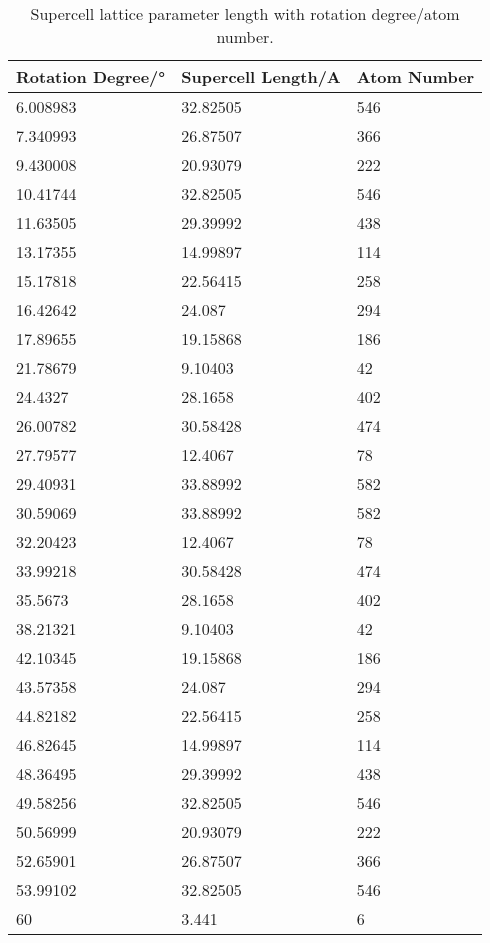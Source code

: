 \begin{table}[ht]
	\caption[Supercell lattice parameter length]{
		Supercell lattice parameter length with rotation degree/atom number.
	}
	\begin{tabular}{lll}
	\toprule
	Rotation Degree/° & Supercell Length/A & Atom Number \\
	\midrule
	6.008983          & 32.82505           & 546         \\
	7.340993          & 26.87507           & 366         \\
	9.430008          & 20.93079           & 222         \\
	10.41744          & 32.82505           & 546         \\
	11.63505          & 29.39992           & 438         \\
	13.17355          & 14.99897           & 114         \\
	15.17818          & 22.56415           & 258         \\
	16.42642          & 24.087             & 294         \\
	17.89655          & 19.15868           & 186         \\
	21.78679          & 9.10403            & 42          \\
	24.4327           & 28.1658            & 402         \\
	26.00782          & 30.58428           & 474         \\
	27.79577          & 12.4067            & 78          \\
	29.40931          & 33.88992           & 582         \\
	30.59069          & 33.88992           & 582         \\
	32.20423          & 12.4067            & 78          \\
	33.99218          & 30.58428           & 474         \\
	35.5673           & 28.1658            & 402         \\
	38.21321          & 9.10403            & 42          \\
	42.10345          & 19.15868           & 186         \\
	43.57358          & 24.087             & 294         \\
	44.82182          & 22.56415           & 258         \\
	46.82645          & 14.99897           & 114         \\
	48.36495          & 29.39992           & 438         \\
	49.58256          & 32.82505           & 546         \\
	50.56999          & 20.93079           & 222         \\
	52.65901          & 26.87507           & 366         \\
	53.99102          & 32.82505           & 546         \\
	60                & 3.441              & 6           \\
	\bottomrule
	\end{tabular}
	\end{table}


